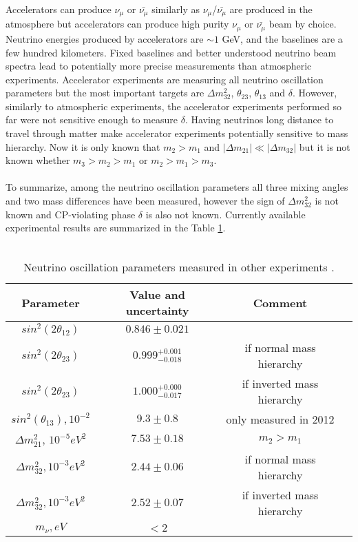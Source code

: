 Accelerators can produce $\nu_\mu$ or $\bar{\nu_\mu}$ similarly as $\nu_\mu$/$\bar{\nu_\mu}$ are produced in the atmosphere but accelerators can produce high purity $\nu_\mu$ or $\bar{\nu_\mu}$ beam by choice. Neutrino energies produced by accelerators are $\sim 1$ GeV, and the baselines are a few hundred kilometers. Fixed baselines and better understood neutrino beam spectra lead to potentially more precise measurements than atmospheric experiments. Accelerator experiments are measuring all neutrino oscillation parameters but the most important targets are ${\Delta}m^2_{32}$, $\theta_{23}$, $\theta_{13}$ and $\delta$. However, similarly to atmospheric experiments, the accelerator experiments performed so far were not sensitive enough to measure $\delta$. Having neutrinos long distance to travel through matter make accelerator experiments potentially sensitive to mass hierarchy. Now it is only known that $m_2>m_1$ and $|{\Delta}m_{21}| \ll |{\Delta}m_{32}|$ but it is not known whether $m_3>m_2>m_1$ or $m_2>m_1>m_3$.\\ \\
To summarize, among the neutrino oscillation parameters all three mixing angles and two mass differences have been measured, however the sign of ${\Delta}m^2_{32}$ is not known and CP-violating phase $\delta$ is also not known. Currently available experimental results are summarized in the Table \ref{tab:MeasuredPars}.\\ \\
\begin{table}[h]
  \begin{center}
  \caption{ Neutrino oscillation parameters measured in other experiments \cite{ref_PDG}.}
  \begin{tabular}{|c|c|c|c|}
     Parameter & Value and uncertainty & Comment \\ \hline
     $sin^2(2\theta_{12})$ &  $0.846\pm0.021$ & \\ \hline 
     $sin^2(2\theta_{23})$ &  $0.999${\tiny{$^{+0.001}_{-0.018}$}} & if normal mass hierarchy \\ \hline 
     $sin^2(2\theta_{23})$ &  $1.000${\tiny{$^{+0.000}_{-0.017}$}}  & if inverted mass hierarchy \\ \hline 
     $sin^2(\theta_{13}), 10^{-2}$ &  $9.3\pm0.8$  & only measured in 2012\\ \hline 
     ${\Delta}m^2_{21}$, $10^{-5} eV^2$ &  $7.53\pm0.18$  &  $m_{2}>m_{1}$   \\ \hline 
     ${\Delta}m^2_{32}, 10^{-3} eV^2$ &  $2.44\pm0.06$  &  if normal mass hierarchy     \\ \hline
     ${\Delta}m^2_{32}, 10^{-3} eV^2$ &  $2.52\pm0.07$  &  if inverted mass hierarchy     \\ \hline
     $m_\nu, eV$ &  $<2$  &      \\ \hline 
  \end{tabular}
  \label{tab:MeasuredPars}
  \end{center}
\end{table}
